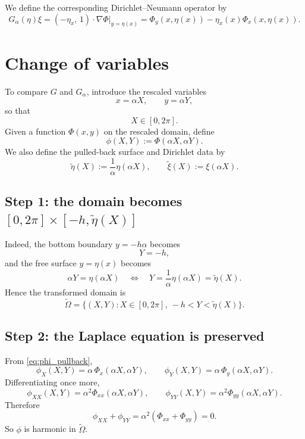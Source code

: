 \documentclass[11pt]{article}
\begin{document}
We define the corresponding Dirichlet--Neumann operator by
\begin{equation}
G_\alpha(\eta)\xi
=
\left( -\eta_x,\, 1 \right)\cdot \nabla \Phi \Big|_{y=\eta(x)}
=
\Phi_y(x,\eta(x))-\eta_x(x)\Phi_x(x,\eta(x)).
\label{eq:Galpha_def}
\end{equation}

\section{Change of variables}

To compare $G$ and $G_\alpha$, introduce the rescaled variables
\begin{equation}
x = \alpha X,
\qquad
y = \alpha Y,
\label{eq:change_var}
\end{equation}
so that
\[
X \in [0,2\pi].
\]
Given a function $\Phi(x,y)$ on the rescaled domain, define
\begin{equation}
\phi(X,Y) := \Phi(\alpha X,\alpha Y).
\label{eq:phi_pullback}
\end{equation}
We also define the pulled-back surface and Dirichlet data by
\begin{equation}
\widetilde{\eta}(X) := \frac{1}{\alpha}\eta(\alpha X),
\qquad
\widetilde{\xi}(X) := \xi(\alpha X).
\label{eq:eta_xi_tilde}
\end{equation}

\subsection*{Step 1: the domain becomes $[0,2\pi] \times [-h,\widetilde{\eta}(X)]$}

Indeed, the bottom boundary $y=-h\alpha$ becomes
\[
Y=-h,
\]
and the free surface $y=\eta(x)$ becomes
\[
\alpha Y = \eta(\alpha X)
\quad \Longleftrightarrow \quad
Y = \frac{1}{\alpha}\eta(\alpha X)=\widetilde{\eta}(X).
\]
Hence the transformed domain is
\[
\widetilde{\Omega}
=
\{(X,Y): X\in[0,2\pi],\ -h<Y<\widetilde{\eta}(X)\}.
\]

\subsection*{Step 2: the Laplace equation is preserved}

From \eqref{eq:phi_pullback},
\[
\phi_X(X,Y) = \alpha\, \Phi_x(\alpha X,\alpha Y),
\qquad
\phi_Y(X,Y) = \alpha\, \Phi_y(\alpha X,\alpha Y).
\]
Differentiating once more,
\[
\phi_{XX}(X,Y)=\alpha^2 \Phi_{xx}(\alpha X,\alpha Y),
\qquad
\phi_{YY}(X,Y)=\alpha^2 \Phi_{yy}(\alpha X,\alpha Y).
\]
Therefore
\[
\phi_{XX}+\phi_{YY}
=
\alpha^2(\Phi_{xx}+\Phi_{yy})=0.
\]
So $\phi$ is harmonic in $\widetilde{\Omega}$.
\end{document}
